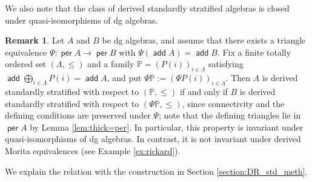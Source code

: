 \documentclass[a4paper,reqno,11pt]{amsart}
\numberwithin{equation}{section}
\theoremstyle{definition}
\newtheorem{remark}[theorem]{Remark}
\newcommand{\PP}{\mathbb{P}}
\DeclareMathOperator{\add}{\mathsf{add}}
\DeclareMathOperator{\per}{\mathsf{per}}
\begin{document}
We also note that the class of derived standardly stratified algebras is closed under quasi-isomorphisms of dg algebras.

\begin{remark}\label{rem:dss_invariance}
Let $A$ and $B$ be dg algebras, and assume that there exists a triangle equivalence $\Psi:\per A\to\per B$ with $\Psi(\add A)=\add B$.
Fix a finite totally ordered set $(\Lambda,\leq)$ and a family $\PP=(P(i))_{i\in\Lambda}$ satisfying $\add\bigoplus_{i\in\Lambda}P(i)=\add A$, and put $\Psi\PP:=(\Psi P(i))_{i\in\Lambda}$.
Then $A$ is derived standardly stratified with respect to $(\PP,\leq)$ if and only if $B$ is derived standardly stratified with respect to $(\Psi\PP,\leq)$, since connectivity and the defining conditions are preserved under $\Psi$; note that the defining triangles lie in $\per A$ by Lemma \ref{lem:thick=per}.
In particular, this property is invariant under quasi-isomorphisms of dg algebras.
In contrast, it is not invariant under derived Morita equivalences (see Example \ref{ex:rickard}).
\end{remark}

We explain the relation with the construction in Section \ref{section:DR_std_meth}.
\end{document}
